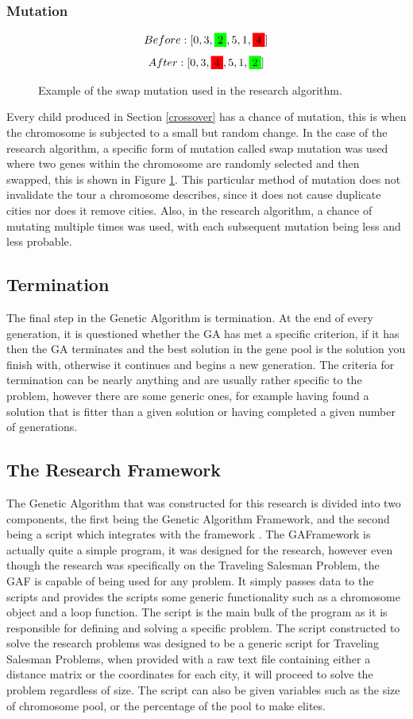 \subsubsection{Mutation}
\par
\begin{figure}[H]
\[Before: [0,3,\colorbox{green}{2},5,1,\colorbox{red}{4}]\]
\[After: [0,3,\colorbox{red}{4},5,1,\colorbox{green}{2}]\]
\caption{Example of the swap mutation used in the research algorithm. \label{fig:mut}}
\end{figure}
Every child produced in Section \ref{crossover} has a chance of mutation, this is when the chromosome is subjected to a small but random change. In the case of the research algorithm, a specific form of mutation called swap mutation was used where two genes within the chromosome are randomly selected and then swapped, this is shown in Figure \ref{fig:mut}. This particular method of mutation does not invalidate the tour a chromosome describes, since it does not cause duplicate cities nor does it remove cities. Also, in the research algorithm, a chance of mutating multiple times was used, with each subsequent mutation being less and less probable.
\subsection{Termination}
\par
The final step in the Genetic Algorithm is termination. At the end of every generation, it is questioned whether the GA has met a specific criterion, if it has then the GA terminates and the best solution in the gene pool is the solution you finish with, otherwise it continues and begins a new generation. The criteria for termination can be nearly anything and are usually rather specific to the problem, however there are some generic ones, for example having found a solution that is fitter than a given solution or having completed a given number of generations.
\subsection{The Research Framework}
\par
The Genetic Algorithm that was constructed for this research is divided into two components, the first being the Genetic Algorithm Framework, and the second being a script which integrates with the framework \cite{Code}.
The GAFramework is actually quite a simple program, it was designed for the research, however even though the research was specifically on the Traveling Salesman Problem, the GAF is capable of being used for any problem. It simply passes data to the scripts and provides the scripts some generic functionality such as a chromosome object and a loop function. The script is the main bulk of the program as it is responsible for defining and solving a specific problem. The script constructed to solve the research problems was designed to be a generic script for Traveling Salesman Problems, when provided with a raw text file containing either a distance matrix or the coordinates for each city, it will proceed to solve the problem regardless of size. The script can also be given variables such as the size of chromosome pool, or the percentage of the pool to make elites. 

